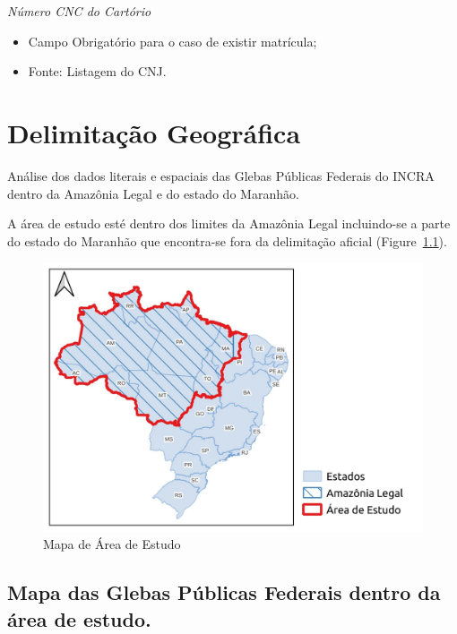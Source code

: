 \documentclass[
  letterpaper,
]{report}
\providecommand{\tightlist}{%
  \setlength{\itemsep}{0pt}\setlength{\parskip}{0pt}}\usepackage{longtable,booktabs,array}
\begin{document}
\emph{Número CNC do Cartório}

\begin{itemize}
\tightlist
\item
  Campo Obrigatório para o caso de existir matrícula;
\item
  Fonte: Listagem do CNJ.
\end{itemize}


\hypertarget{delimitauxe7uxe3o-geogruxe1fica}{%
\chapter{Delimitação Geográfica}\label{delimitauxe7uxe3o-geogruxe1fica}}

Análise dos dados literais e espaciais das Glebas Públicas Federais do
INCRA dentro da Amazônia Legal e do estado do Maranhão.

A área de estudo esté dentro dos limites da Amazônia Legal incluindo-se
a parte do estado do Maranhão que encontra-se fora da delimitação
aficial (Figure~\ref{fig-area-estudo}).

\begin{figure}[H]

{\centering \includegraphics{././img/a6-geral.jpg}

}

\caption{\label{fig-area-estudo}Mapa de Área de Estudo}

\end{figure}

\hypertarget{mapa-das-glebas-puxfablicas-federais-dentro-da-uxe1rea-de-estudo.}{%
\section{Mapa das Glebas Públicas Federais dentro da área de
estudo.}\label{mapa-das-glebas-puxfablicas-federais-dentro-da-uxe1rea-de-estudo.}}
\end{document}
